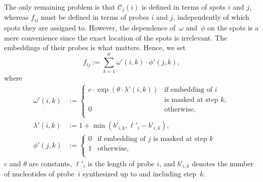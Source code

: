 {The only remaining problem is that $\mathcal{C}_j(i)$ is defined in terms of spots $i$ and $j$, whereas $f_{ij}$ must be defined in terms of probes $i$ and $j$, independently of which spots they are assigned to. However, the dependence of~$\omega$ and~$\phi$ on the spots is a mere convenience since the exact location of the spots is irrelevant. The embeddings of their probes is what matters. Hence, we set
\begin{equation}
f_{ij} := \sum_{k=1}^{\mu} \omega'(i,k) \cdot \phi'(j,k),
\end{equation}
where
\begin{align}
\omega'(i,k) &:=
        \left\{
                \begin{array}{ll}
                        c \cdot \exp{\left(\theta \cdot \lambda'(i,k)\right)} &
                            \mbox{if embedding of $i$} \\
                          & \mbox{is masked at step $k$}, \\
                        0 & \mbox{otherwise}, \\
                \end{array}
        \right. \\
\lambda'(i,k) &:= 1 + \min(b'_{i,k},\ell'_{i} - b'_{i,k}), \\
\phi'(j,k) &:=
        \left\{
                \begin{array}{ll}
                        0 & \mbox{if embedding of $j$ is masked at step $k$} \\
                        1 & \mbox{otherwise}, \\
                \end{array}
        \right.
\end{align}
$c$ and $\theta$ are constants, $\ell'_i$ is the length of probe $i$, and $b'_{i,k}$ denotes the number of nucleotides of probe~$i$ synthesized up to and including step~$k$.

}


